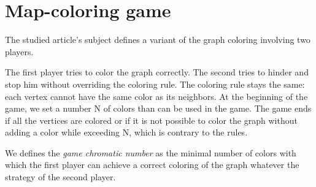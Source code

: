 \section{Map-coloring game}

The studied article's subject defines a variant of the graph coloring involving two players.

The first player tries to color the graph correctly. The second tries to hinder and stop him without overriding the coloring rule. The coloring rule stays the same: each vertex cannot have the same color as its neighbors. 
At the beginning of the game, we set a number N of colors than can be used in the game. The game ends if all the vertices are colored or if it is not possible to color the graph without adding a color while exceeding N, which is contrary to the rules.

 
We defines the \textit{game chromatic number} as the minimal number of colors with which the first player can achieve a correct coloring of the graph whatever the strategy of the second player.
